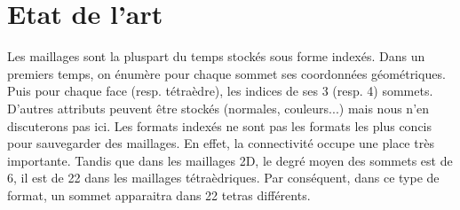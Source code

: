 \documentclass[a4paper,11pt,openany]{article}
\begin{document}
\section{Etat de l'art}
\noindent
Les maillages sont la pluspart du temps stockés sous forme indexés. Dans un premiers temps, on énumère pour chaque sommet ses coordonnées géométriques. Puis pour chaque face (resp. tétraèdre), les indices de ses 3 (resp. 4) sommets. D'autres attributs peuvent être stockés (normales, couleurs...) mais nous n'en discuterons pas ici. Les formats indexés ne sont pas les formats les plus concis pour sauvegarder des maillages. En effet, la connectivité occupe une place très importante. Tandis que dans les maillages 2D, le degré moyen des sommets est de 6, il est de 22 dans les maillages tétraèdriques. Par conséquent, dans ce type de format, un sommet apparaitra dans 22 tetras différents.\\
\end{document}
